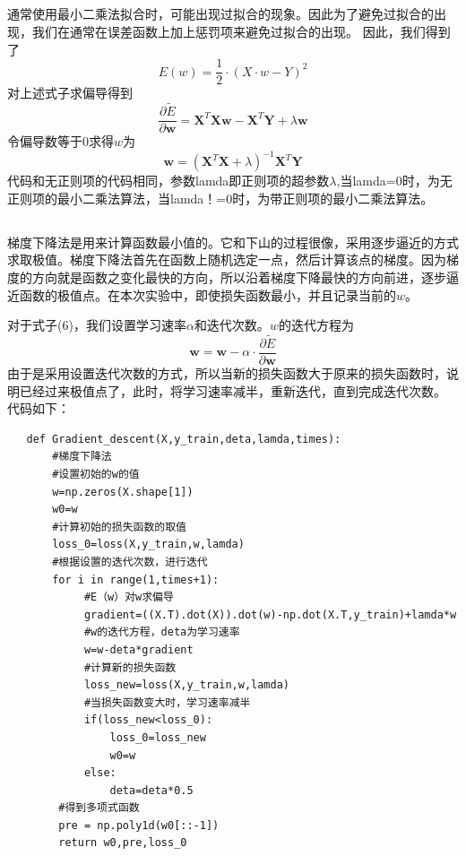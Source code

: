 \documentclass[lang=cn,a4paper,cite=authoryear]{elegantpaper}
\begin{document}
\subsection*{}
通常使用最小二乘法拟合时，可能出现过拟合的现象。因此为了避免过拟合的出现，我们在通常在误差函数上加上惩罚项来避免过拟合的出现。
因此，我们得到了
\begin{equation}
	E\left( w \right) =\frac{1}{2}\cdot \left( X\cdot w-Y \right) ^2
\end{equation}
对上述式子求偏导得到
\begin{equation}
\frac{\partial \widetilde{E}}{\partial \boldsymbol{w}}=\boldsymbol{X}^{T} \boldsymbol{X} \boldsymbol{w}-\boldsymbol{X}^{T} \boldsymbol{Y}+\lambda \boldsymbol{w}
\end{equation}
令偏导数等于0求得$w$为
\begin{equation}
\boldsymbol{w}=\left(\boldsymbol{X}^{T} \boldsymbol{X}+\lambda\right)^{-1} \boldsymbol{X}^{T} \boldsymbol{Y}
\end{equation}
代码和无正则项的代码相同，参数lamda即正则项的超参数$\lambda$,当lamda=0时，为无正则项的最小二乘法算法，当lamda！=0时，为带正则项的最小二乘法算法。
\subsection*{}
梯度下降法是用来计算函数最小值的。它和下山的过程很像，采用逐步逼近的方式求取极值。梯度下降法首先在函数上随机选定一点，然后计算该点的梯度。因为梯度的方向就是函数之变化最快的方向，所以沿着梯度下降最快的方向前进，逐步逼近函数的极值点。在本次实验中，即使损失函数最小，并且记录当前的$w$。
\par 对于式子(6)，我们设置学习速率$\alpha$和迭代次数。$w$的迭代方程为
\begin{equation}
	\boldsymbol{w}=\boldsymbol{w}-\alpha \cdot \frac{\partial \widetilde{E}}{\partial \boldsymbol{w}}
\end{equation}
由于是采用设置迭代次数的方式，所以当新的损失函数大于原来的损失函数时，说明已经过来极值点了，此时，将学习速率减半，重新迭代，直到完成迭代次数。
代码如下：
\begin{verbatim}
   def Gradient_descent(X,y_train,deta,lamda,times):
       #梯度下降法
       #设置初始的w的值
       w=np.zeros(X.shape[1])
       w0=w
       #计算初始的损失函数的取值
       loss_0=loss(X,y_train,w,lamda)
       #根据设置的迭代次数，进行迭代
       for i in range(1,times+1):
            #E（w）对w求偏导
            gradient=((X.T).dot(X)).dot(w)-np.dot(X.T,y_train)+lamda*w
            #w的迭代方程，deta为学习速率
            w=w-deta*gradient
            #计算新的损失函数
            loss_new=loss(X,y_train,w,lamda)
            #当损失函数变大时，学习速率减半
            if(loss_new<loss_0):
                loss_0=loss_new
                w0=w
            else:
                deta=deta*0.5
        #得到多项式函数
        pre = np.poly1d(w0[::-1])
        return w0,pre,loss_0
\end{verbatim}
\end{document}
